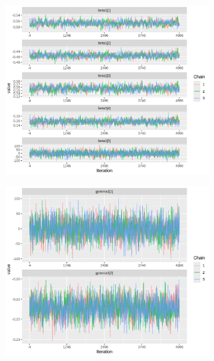 \documentclass[12pt]{article}
\begin{document}
\begin{figure}[h!]
    \centering
    \begin{subfigure}{0.45\textwidth}
        \includegraphics[width=\linewidth]{pictures/mod2/mod2trace_beta.png}
    \end{subfigure}
    \begin{subfigure}{0.45\textwidth}
        \includegraphics[width=\linewidth]{pictures/mod2/mod2trace_gamma.png}
    \end{subfigure}


\end{figure}
\end{document}

